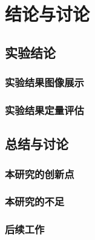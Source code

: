 \chapter{结论与讨论}
\section{实验结论}
\subsection{实验结果图像展示}
\subsection{实验结果定量评估}
\section{总结与讨论}
\subsection{本研究的创新点}
\subsection{本研究的不足}
\subsection{后续工作}

